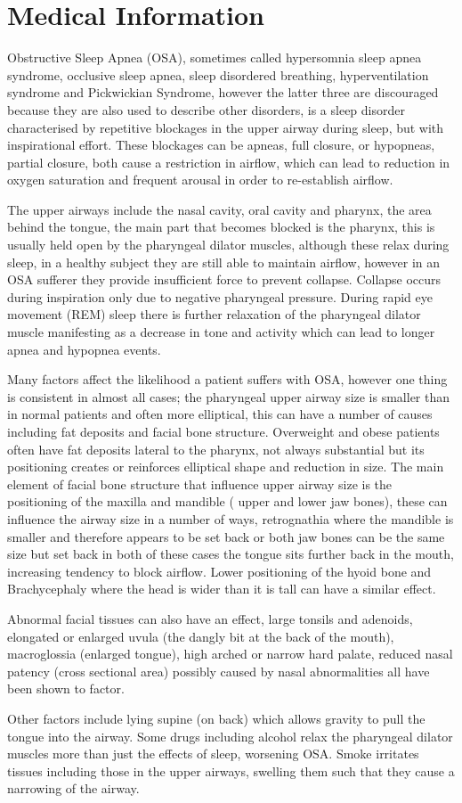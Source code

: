 \chapter{Medical Information}
Obstructive Sleep Apnea (OSA), sometimes called hypersomnia sleep apnea syndrome, occlusive sleep apnea, sleep disordered breathing, hyperventilation syndrome and Pickwickian Syndrome, however the latter three are discouraged because they are also used to describe other disorders, is a sleep disorder characterised by repetitive blockages in the upper airway during sleep, but with inspirational effort. These blockages can be apneas, full closure, or hypopneas, partial closure, both cause a restriction in airflow, which can lead to reduction in oxygen saturation and frequent arousal in order to re-establish airflow. 

The upper airways include the nasal cavity, oral cavity and pharynx, the area behind the tongue, the main part that becomes blocked is the pharynx, this is usually held open by the pharyngeal dilator muscles, although these relax during sleep, in a healthy subject they are still able to maintain airflow, however in an OSA sufferer they provide insufficient force to prevent collapse. Collapse occurs during inspiration only due to negative pharyngeal pressure. During rapid eye movement (REM) sleep there is further relaxation of the pharyngeal dilator muscle manifesting as a decrease in tone and activity which can lead to longer apnea and hypopnea events. 

Many factors affect the likelihood a patient suffers with OSA, however one thing is consistent in almost all cases; the pharyngeal upper airway size is smaller than in normal patients and often more elliptical, this can have a number of causes including fat deposits and facial bone structure. Overweight and obese patients often have fat deposits lateral to the pharynx, not always substantial but its positioning creates or reinforces elliptical shape and reduction in size. The main element of facial bone structure that influence upper airway size is the positioning of the maxilla and mandible ( upper and lower jaw bones), these can influence the airway size in a number of ways, retrognathia where the mandible is smaller and therefore appears to be set back or both jaw bones can be the same size but set back in both of these cases the tongue sits further back in the mouth, increasing tendency to block airflow. Lower positioning of the hyoid bone and Brachycephaly where the head is wider than it is tall can have a similar effect. 

Abnormal facial tissues can also have an effect, large tonsils and adenoids, elongated or enlarged uvula (the dangly bit at the back of the mouth), macroglossia (enlarged tongue), high arched or narrow hard palate, reduced nasal patency (cross sectional area) possibly caused by nasal abnormalities all have been shown to factor.

Other factors include lying supine (on back) which allows gravity to pull the tongue into the airway. Some drugs including alcohol relax the pharyngeal dilator muscles more than just the effects of sleep, worsening OSA. Smoke irritates tissues including those in the upper airways, swelling them such that they cause a narrowing of the airway.